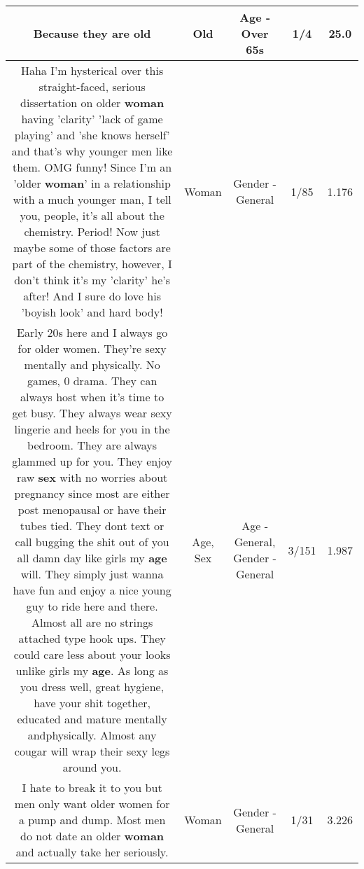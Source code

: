 \documentclass[11pt]{article}
\newlength\mylength
\begin{document}
\begin{center}
\begin{longtable}{|C{.65\mylength}|C{.30\mylength}|C{.12\mylength}|C{.12\mylength}|C{.12\mylength}|}
  \small Because they are old\normalsize   & Old & Age - Over 65s & 1/4 & 25.0 \\  \hline
  \small Haha I'm hysterical over this straight-faced, serious dissertation on older \textbf{woman} having 'clarity' 'lack of game playing' and 'she knows herself' and that's why younger men like them.  OMG funny!  Since I'm an 'older \textbf{woman}' in a relationship with a much younger man, I tell you, people, it's all about the chemistry.  Period! Now just maybe some of those factors are part of the chemistry, however, I don't think it's my 'clarity' he's after!  And I sure do love his 'boyish look' and hard body!\normalsize   & Woman & Gender - General & 1/85 & 1.176 \\  \hline
  \small Early 20s here and I always go for older women. They're sexy mentally and physically. No games, 0 drama. They can always host when it's time to get busy. They always wear sexy lingerie and heels for you in the bedroom. They are always glammed up for you. They enjoy raw \textbf{sex} with no worries about pregnancy since most are either post menopausal or have their tubes tied.   They dont text or call bugging the shit out of you all damn day like girls my \textbf{age} will. They simply just wanna have fun and enjoy a nice young guy to ride here and there. Almost all are no strings attached type hook ups. They could care less about your looks unlike girls my \textbf{age}. As long as you dress well, great hygiene, have your shit together, educated and mature mentally andphysically. Almost any cougar will wrap their sexy legs around you.\normalsize   & Age, Sex & Age - General, Gender - General & 3/151 & 1.987 \\  \hline
  \small I hate to break it to you but men only want older women for a pump and dump. Most men do not date an older \textbf{woman} and actually take her seriously.\normalsize   & Woman & Gender - General & 1/31 & 3.226 \\  \hline

\end{longtable}
\end{center}
\end{document}

